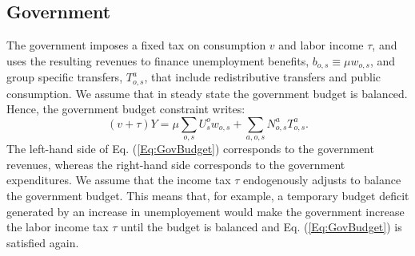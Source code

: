 \documentclass[a4paper,12pt]{article}
\begin{document}
\subsection{Government} \label{government}

The government imposes a fixed tax on consumption $v$ and labor income $\tau 
$, and uses the resulting revenues to finance unemployment benefits, $%
b_{o,s}\equiv \mu w_{o,s}$, and group specific transfers, $T^a_{o,s}$, that
include redistributive transfers and public consumption. We assume that in
steady state the government budget is balanced. Hence, the government budget
constraint writes: 
\begin{equation}
\left( v+\tau \right) Y=\mu \sum \limits_{o,s}U_{s}^{o}w_{o,s}+\sum
\limits_{a,o,s}N_{o,s}^{a}T_{o,s}^{a}.  \label{Eq:GovBudget}
\end{equation}%
The left-hand side of Eq. (\ref{Eq:GovBudget}) corresponds to the government
revenues, whereas the right-hand side corresponds to the government
expenditures. We assume that the income tax $\tau $ endogenously adjusts to
balance the government budget. This means that, for example, a temporary
budget deficit generated by an increase in unemployement would make the
government increase the labor income tax $\tau $ until the budget is
balanced and Eq. (\ref{Eq:GovBudget}) is satisfied again.
\end{document}
